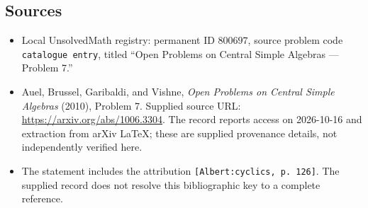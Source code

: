 \documentclass[11pt]{article}
\begin{document}
\subsection{Sources}
\begin{itemize}
\item Local UnsolvedMath registry: permanent ID \(800697\), source problem code \texttt{catalogue entry}, titled ``Open Problems on Central Simple Algebras --- Problem 7.''
\item Auel, Brussel, Garibaldi, and Vishne, \emph{Open Problems on Central Simple Algebras} (2010), Problem 7. Supplied source URL: \url{https://arxiv.org/abs/1006.3304}. The record reports access on 2026-10-16 and extraction from arXiv LaTeX; these are supplied provenance details, not independently verified here.
\item The statement includes the attribution \texttt{[Albert:cyclics, p. 126]}. The supplied record does not resolve this bibliographic key to a complete reference.
\end{itemize}
\end{document}
